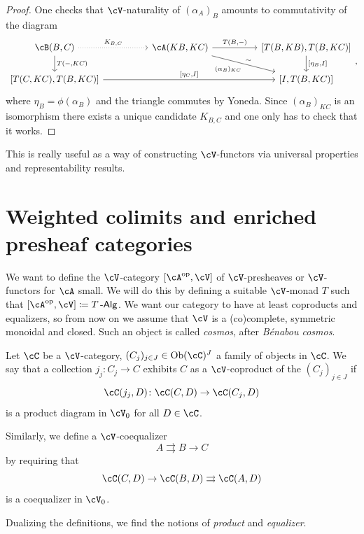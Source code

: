 \documentclass[a4paper,11pt,oneside,openany]{scrbook}
\begin{document}
\begin{proof}
	One checks that $\cV$-naturality of $(\alpha_A)_B$ amounts to commutativity of the diagram
	\[
		\begin{tikzcd}[column sep = 5em]
			\cB(B,C)\ar[r, dotted, "K_{B,C}"]\ar[d, "{T(-,KC)}"]
			& \cA(KB,KC)\ar[r, "{T(B,-)}"]\ar[dr, "\sim"', swap, "{(\alpha_B)_{KC}}"]
			& {[T(B,KB),T(B,KC)]}\ar[d, "{[\eta_B, I]}"] \\
			{[T(C,KC),T(B,KC)]}\ar[rr, "{[\eta_C,I]}"]
			&& {[I,T(B,KC)]}
		\end{tikzcd}
		,\]
	where $\eta_B=\phi(\alpha_B)$ and the triangle commutes by Yoneda. Since $(\alpha_B)_{KC}$ is an isomorphism there exists a unique candidate $K_{B,C}$ and one only has to check that it works.
\end{proof}

\begin{rmk}
	This is really useful as a way of constructing $\cV$-functors via universal properties and representability results.
\end{rmk}

\section{Weighted colimits and enriched presheaf categories}

We want to define the $\cV$-category $[\cA^{\op},\cV]$ of $\cV$-presheaves or $\cV$-functors for $\cA$ small. We will do this by defining a suitable $\cV$-monad $T$ such that $[\cA^{\op},\cV]\coloneqq T\Alg$. We want our category to have at least coproducts and equalizers, so from now on we assume that $\cV$ is a (co)complete, symmetric monoidal and closed. Such an object is called \emph{cosmos}, after \emph{B\'enabou cosmos}.

\begin{defn}
	Let $\cC$ be a $\cV$-category, $(C_j)_{j\in J}\in\Ob(\cC)^J$ a family of objects in $\cC$. We say that a collection $j_j\colon C_j\rightarrow C$ exhibits $C$ as a $\cV$-coproduct of the $(C_j)_{j\in J}$ if$$\cC(j_j,D)\colon\cC(C,D)\rightarrow\cC(C_j,D)$$is a product diagram in $\cV_0$ for all $D\in\cC$.

	Similarly, we define a $\cV$-coequalizer$$A\rightrightarrows B\rightarrow C$$ by requiring that $$\cC(C,D)\rightarrow\cC(B,D)\rightrightarrows\cC(A,D)$$is a coequalizer in $\cV_0$.

	Dualizing the definitions, we find the notions of \emph{product} and \emph{equalizer}.
\end{defn}
\end{document}
